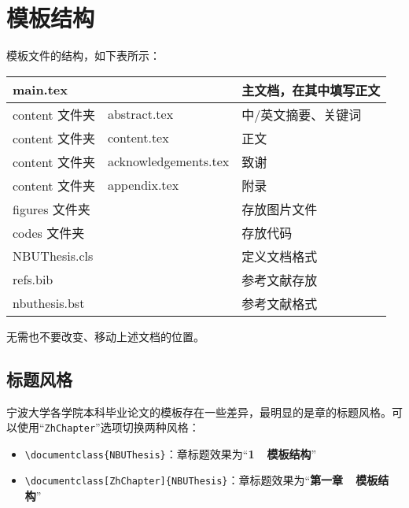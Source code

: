 

\chapter{模板结构}

模板文件的结构，如下表所示：
\begin{table}[ht]\centering
\begin{tabular}{r|l|l}
\hline
\multicolumn{2}{l|}{main.tex }       & 主文档，在其中填写正文  \\ \hline
content 文件夹 & abstract.tex         & 中/英文摘要、关键词     \\ \cline{2-3} \hline
content 文件夹 & content.tex          & 正文                     \\ \hline
content 文件夹 & acknowledgements.tex & 致谢                     \\ \hline
content 文件夹 & appendix.tex         & 附录                     \\ \hline
\multicolumn{2}{l|}{figures 文件夹}   & 存放图片文件            \\ \hline
\multicolumn{2}{l|}{codes 文件夹}     & 存放代码                \\ \hline
\multicolumn{2}{l|}{NBUThesis.cls}   & 定义文档格式             \\ \hline
\multicolumn{2}{l|}{refs.bib}        & 参考文献存放             \\ \hline
\multicolumn{2}{l|}{nbuthesis.bst}   & 参考文献格式             \\ \hline
\end{tabular}
\end{table}

无需也不要改变、移动上述文档的位置。

\section{标题风格}
宁波大学各学院本科毕业论文的模板存在一些差异，最明显的是章的标题风格。可以使用“\verb|ZhChapter|”选项切换两种风格：
\begin{itemize}
\item \verb|\documentclass{NBUThesis}|：章标题效果为“\textbf{1~~模板结构}”
\item \verb|\documentclass[ZhChapter]{NBUThesis}|：章标题效果为“\textbf{第一章~~模板结构}”
\end{itemize}

